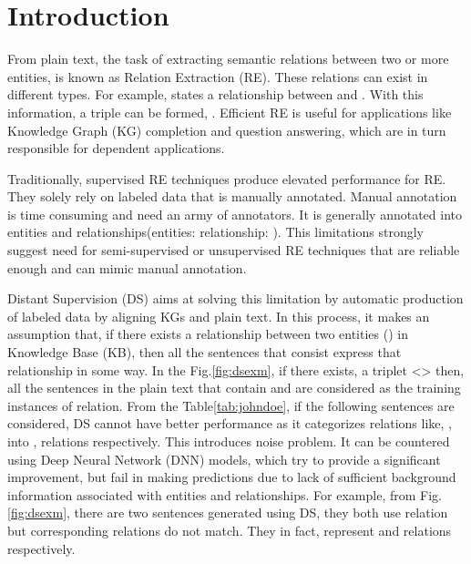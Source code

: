 \chapter{Introduction}
\label{ch:introduction}

\newpar
From plain text, the task of extracting semantic relations between two or more entities, is known as Relation Extraction (RE). These relations can exist in different types. For example,  states a  relationship between  and . With this information, a triple can be formed, . Efficient RE is useful for applications like Knowledge Graph (KG) completion and question answering, which are in turn responsible for dependent applications. 


\newpar
Traditionally, supervised RE techniques produce elevated performance for RE\cite{bibid}. They solely rely on labeled data that is manually annotated. Manual annotation is time consuming and need an army of annotators. It is generally annotated into entities and relationships(entities:  relationship: ). This limitations strongly suggest need for semi-supervised or unsupervised RE techniques that are reliable enough and can mimic manual annotation.  

\newpar
Distant Supervision (DS) aims at solving this limitation by automatic production of labeled data by aligning KGs and plain text. In this process, it makes an assumption that, if there exists a relationship between two entities () in Knowledge Base (KB), then all the sentences that consist  express that relationship in some way\cite{zeng2015distant}. 
In the Fig.\ref{fig:dsexm}, if there exists, a triplet <> then, all the sentences in the plain text that contain  and  are considered as the training instances of  relation. From the Table\ref{tab:johndoe}, if the following sentences are considered, DS cannot have better performance as it categorizes relations like, ,  into ,  relations respectively. This introduces noise problem. It can be countered using Deep Neural Network (DNN) models, which try to provide a significant improvement, but fail in making predictions due to lack of sufficient background information associated with entities and relationships. For example, from Fig.\ref{fig:dsexm}, there are two sentences generated using DS, they both use  relation but corresponding relations do not match. They in fact, represent  and  relations respectively.

